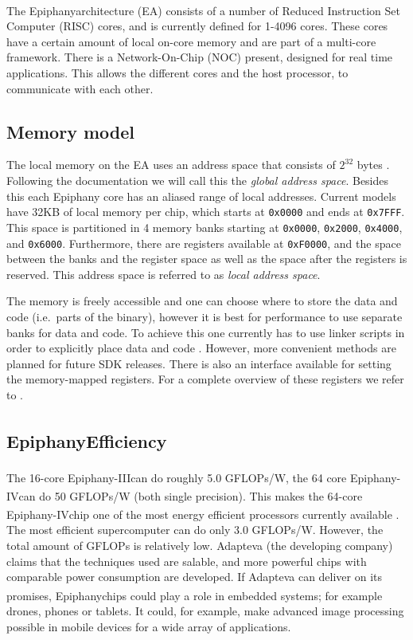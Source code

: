 \documentclass[fleqn]{article}
\renewcommand{\(}{\left(}
\renewcommand{\)}{\right)}
\newcommand{\tm}{\textsuperscript{\texttrademark}}
\begin{document}
The Epiphany\tm architecture (EA) consists of a number of Reduced Instruction Set Computer (RISC) cores, and is currently defined for 1-4096 cores. These cores have a certain amount of local on-core memory and are part of a multi-core framework. There is a Network-On-Chip (NOC) present, designed for real time applications. This allows the different cores and the host processor, to communicate with each other. 

\subsection{Memory model}

The local memory on the EA uses an address space that consists of $2^{32}$ bytes \cite{ep:sdkdoc}. Following the documentation we will call this the \emph{global address space}. Besides this each Epiphany core has an aliased range of local addresses. Current models have 32KB of local memory per chip, which starts at \texttt{0x0000} and ends at \texttt{0x7FFF}. This space is partitioned in 4 memory banks starting at \texttt{0x0000}, \texttt{0x2000}, \texttt{0x4000}, and \texttt{0x6000}. Furthermore, there are registers available at \texttt{0xF0000}, and the space between the banks and the register space as well as the space after the registers is reserved. This address space is referred to as \emph{local address space}.



The memory is freely accessible and one can choose where to store the data and code (i.e.\ parts of the binary), however it is best for performance to use separate banks for data and code. To achieve this one currently has to use linker scripts in order to explicitly place data and code \cite{ep:sdkdoc}. However, more convenient methods are planned for future SDK releases. There is also an interface available for setting the memory-mapped registers. For a complete overview of these registers we refer to \cite{ep:archdoc}.

\subsection{Epiphany\tm Efficiency}
The 16-core Epiphany-III\tm can do roughly 5.0 GFLOPs/W, the 64 core Epiphany-IV\tm can do 50 GFLOPs/W (both single precision). This makes the 64-core Epiphany-IV\tm chip one of the most energy efficient processors currently available \cite{ep:power}. The most efficient supercomputer can do only 3.0 GFLOPs/W. However, the total amount of GFLOPs is relatively low. Adapteva (the developing company) claims that the techniques used are salable, and more powerful chips with comparable power consumption are developed. If Adapteva can deliver on its promises, Epiphany\tm chips could play a role in embedded systems; for example drones, phones or tablets. It could, for example, make advanced image processing possible in mobile devices for a wide array of applications.
\end{document}
